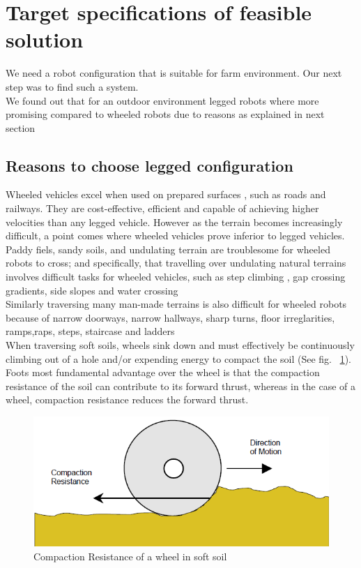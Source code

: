 \documentclass{report}
\begin{document}
\section{Target specifications of feasible solution}
We need a robot configuration that is suitable for farm environment. Our next step was to find such a system.\\
We found out that for an outdoor environment legged robots where more promising compared to wheeled robots due to  reasons as explained in next section
\subsection{Reasons to choose legged configuration}
Wheeled vehicles excel when used on prepared surfaces , such as roads and railways. They are cost-effective, efficient and capable of achieving higher velocities than any legged vehicle. However as the terrain becomes increasingly difficult, a point comes where wheeled vehicles prove inferior to legged vehicles.\\
Paddy fiels, sandy soils, and undulating terrain are troublesome for wheeled robots to cross; and specifically, that travelling over undulating natural terrains involves difficult tasks for wheeled vehicles, such as step climbing , gap crossing gradients, side slopes and water crossing\\
Similarly traversing many man-made terrains is also difficult for wheeled robots  because of narrow doorways, narrow hallways, sharp turns, floor irreglarities, ramps,raps, steps, staircase and ladders\\
When traversing soft soils, wheels sink down and must effectively be continuously climbing out of a hole and/or expending energy to compact the soil (See fig. ~\ref{fig1}). Foots most fundamental advantage over the wheel is that the compaction resistance of the soil can contribute to its forward thrust, whereas in the case of a wheel, compaction resistance reduces the forward thrust.
\begin{figure}[h!]
\centering
\includegraphics[width=\textwidth]{figcompaction}
\caption{Compaction Resistance of a wheel in soft soil}
\label{fig1}
\end{figure}
\end{document}
